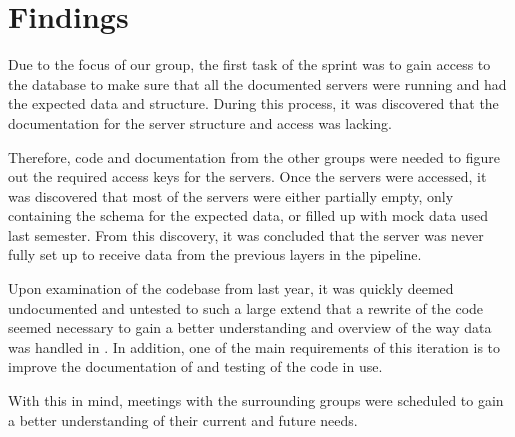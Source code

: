 \section{Findings}
Due to the focus of our group, the first task of the sprint was to gain access to the database to make 
sure that all the documented servers were running and had the expected data and structure. 
During this process, it was discovered that the documentation for the server structure and access was lacking. 

Therefore, code and documentation from the other \knox{} groups were needed to figure out the 
required access keys for the servers. 
Once the servers were accessed, it was discovered that most of the servers were either partially empty, only containing the schema for the expected data, or filled up with mock data used last semester. 
From this discovery, it was concluded that the server was never fully set up to receive data from the previous layers in the pipeline. 

Upon examination of the codebase from last year, it was quickly deemed undocumented and untested to such a large extend that a rewrite of the code seemed necessary to gain a better understanding and overview of the way data was handled in \knox{}. 
In addition, one of the main requirements of this iteration is to improve the documentation of \knox{} and testing of the code in use. 

With this in mind, meetings with the surrounding groups were scheduled to gain a better understanding of their current and future needs.
